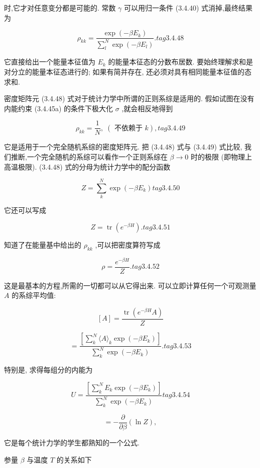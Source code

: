 时,它才对任意变分都是可能的. 常数 $\gamma$ 可以用归一条件 (3.4.40) 式消掉,最终结果为

$$
{\rho }_{kk} = \frac{\exp \left( {-\beta {E}_{k}}\right) }{\mathop{\sum }\limits_{l}^{N}\exp \left( {-\beta {E}_{l}}\right) }. tag{3. 4.48}
$$

它直接给出一个能量本征值为 ${E}_{k}$ 的能量本征态的分数布居数. 要始终理解求和是对分立的能量本征态进行的; 如果有简并存在, 还必须对具有相同能量本征值的态求和.

密度矩阵元 (3.4.48) 式对于统计力学中所谓的正则系综是适用的. 假如试图在没有内能约束 (3.4.45a) 的条件下极大化 $\sigma$ ,就会相反地得到

$$
{\rho }_{kk} = \frac{1}{N},\;\left( {\text{ 不依赖于 }k}\right) , tag{3.4.49}
$$

它是适用于一个完全随机系综的密度矩阵元. 把 (3.4.48) 式与 (3.4.49) 式比较, 我们推断,一个完全随机的系综可以看作一个正则系综在 $\beta \rightarrow 0$ 时的极限 (即物理上高温极限). (3.4.48) 式的分母为统计力学中的配分函数

$$
Z = \mathop{\sum }\limits_{k}^{N}\exp \left( {-\beta {E}_{k}}\right) tag{3. 4.50}
$$

它还可以写成

$$
Z = \operatorname{tr}\left( {e}^{-{\beta H}}\right) . tag{3. 4.51}
$$

知道了在能量基中给出的 ${\rho }_{kk}$ ,可以把密度算符写成

$$
\rho = \frac{{e}^{-{\beta H}}}{Z}. tag{3. 4.52}
$$

这是最基本的方程,所需的一切都可以从它得出来. 可以立即计算任何一个可观测量 $A$ 的系综平均值:

$$
\left\lbrack A\right\rbrack = \frac{\operatorname{tr}\left( {{e}^{-{\beta H}}A}\right) }{Z}
$$

$$
= \frac{\left\lbrack \mathop{\sum }\limits_{k}^{N}\langle A{\rangle }_{k}\exp \left( -\beta {E}_{k}\right) \right\rbrack }{\mathop{\sum }\limits_{k}^{N}\exp \left( {-\beta {E}_{k}}\right) }. tag{3. 4.53}
$$

特别是, 求得每组分的内能为

$$
U = \frac{\left\lbrack \mathop{\sum }\limits_{k}^{N}{E}_{k}\exp \left( -\beta {E}_{k}\right) \right\rbrack }{\mathop{\sum }\limits_{k}^{N}\exp \left( {-\beta {E}_{k}}\right) } tag{3. 4.54}
$$

$$
= - \frac{\partial }{\partial \beta }\left( {\ln Z}\right) ,
$$

它是每个统计力学的学生都熟知的一个公式.

参量 $\beta$ 与温度 $T$ 的关系如下

